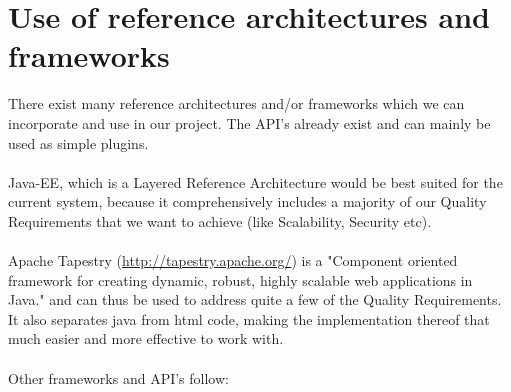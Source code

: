 \documentclass[hidelinks, 12pt]{article}
\begin{document}
\section{Use of reference architectures and frameworks}
There exist many reference architectures and/or frameworks which we can incorporate and use in our project. The API's already exist and can mainly be used as simple plugins.
\\ \\
Java-EE, which is a Layered Reference Architecture would be best suited for the current system, because it comprehensively includes a majority of our Quality Requirements that we want to achieve (like Scalability, Security etc).
\\ \\
Apache Tapestry (\url{http://tapestry.apache.org/}) is a "Component oriented framework for creating dynamic, robust, highly scalable web applications in Java." and can thus be used to address quite a few of the Quality Requirements. It also separates java from html code, making the implementation thereof that much easier and more effective to work with.
\\ \\
Other frameworks and API's follow:
\end{document}
